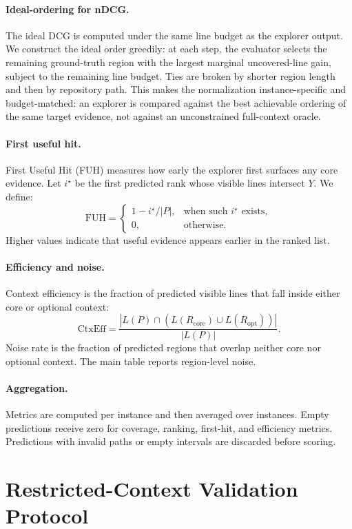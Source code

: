 \paragraph{Ideal-ordering for nDCG.}
\label{app:idcg}
The ideal DCG is computed under the same line budget as the explorer output. We
construct the ideal order greedily: at each step, the evaluator selects the
remaining ground-truth region with the largest marginal uncovered-line gain,
subject to the remaining line budget. Ties are broken by shorter region length
and then by repository path. This makes the normalization instance-specific and
budget-matched: an explorer is compared against the best achievable ordering of
the same target evidence, not against an unconstrained full-context oracle.

\paragraph{First useful hit.}
First Useful Hit (FUH) measures how early the explorer first surfaces any core
evidence. Let $i^\star$ be the first predicted rank whose visible lines intersect
$Y$. We define:
\[
\mathrm{FUH}
=
\begin{cases}
1 - i^\star/|P|, & \text{when such } i^\star \text{ exists},\\
0, & \text{otherwise}.
\end{cases}
\]
Higher values indicate that useful evidence appears earlier in the ranked list.

\paragraph{Efficiency and noise.}
Context efficiency is the fraction of predicted visible lines that fall inside
either core or optional context:
\[
\mathrm{CtxEff}
=
\frac{
|L(P)\cap (L(R_{\mathrm{core}})\cup L(R_{\mathrm{opt}}))|
}{
|L(P)|
}.
\]
Noise rate is the fraction of predicted regions that overlap neither core nor
optional context. The main table reports region-level noise.

\paragraph{Aggregation.}
Metrics are computed per instance and then averaged over instances. Empty
predictions receive zero for coverage, ranking, first-hit, and efficiency
metrics. Predictions with invalid paths or empty intervals are discarded before
scoring.


\section{Restricted-Context Validation Protocol}
\label{app:bridge}
\label{app:restricted_context}

